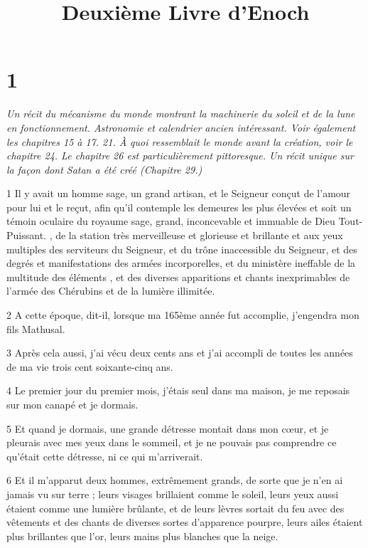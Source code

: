

\title{Deuxième Livre d'Enoch}

\chapter{1}

\par \textit{Un récit du mécanisme du monde montrant la machinerie du soleil et de la lune en fonctionnement. Astronomie et calendrier ancien intéressant. Voir également les chapitres 15 à 17. 21. À quoi ressemblait le monde avant la création, voir le chapitre 24. Le chapitre 26 est particulièrement pittoresque. Un récit unique sur la façon dont Satan a été créé (Chapitre 29.)}

\par 1 Il y avait un homme sage, un grand artisan, et le Seigneur conçut de l'amour pour lui et le reçut, afin qu'il contemple les demeures les plus élevées et soit un témoin oculaire du royaume sage, grand, inconcevable et immuable de Dieu Tout-Puissant. , de la station très merveilleuse et glorieuse et brillante et aux yeux multiples des serviteurs du Seigneur, et du trône inaccessible du Seigneur, et des degrés et manifestations des armées incorporelles, et du ministère ineffable de la multitude des éléments , et des diverses apparitions et chants inexprimables de l'armée des Chérubins et de la lumière illimitée.

\par 2 A cette époque, dit-il, lorsque ma 165ème année fut accomplie, j'engendra mon fils Mathusal.

\par 3 Après cela aussi, j'ai vécu deux cents ans et j'ai accompli de toutes les années de ma vie trois cent soixante-cinq ans.

\par 4 Le premier jour du premier mois, j'étais seul dans ma maison, je me reposais sur mon canapé et je dormais.

\par 5 Et quand je dormais, une grande détresse montait dans mon cœur, et je pleurais avec mes yeux dans le sommeil, et je ne pouvais pas comprendre ce qu'était cette détresse, ni ce qui m'arriverait.

\par 6 Et il m'apparut deux hommes, extrêmement grands, de sorte que je n'en ai jamais vu sur terre ; leurs visages brillaient comme le soleil, leurs yeux aussi étaient comme une lumière brûlante, et de leurs lèvres sortait du feu avec des vêtements et des chants de diverses sortes d'apparence pourpre, leurs ailes étaient plus brillantes que l'or, leurs mains plus blanches que la neige.

